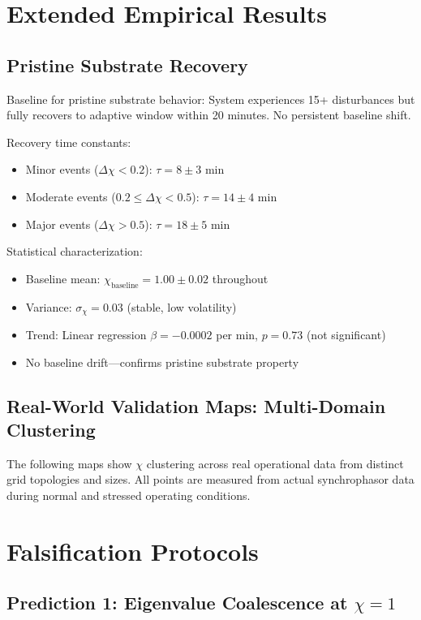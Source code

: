 \documentclass[11pt,letterpaper]{article}
\newcommand{\symchi}{\chi}
\begin{document}
\section{Extended Empirical Results}

\subsection{Pristine Substrate Recovery}

Baseline for pristine substrate behavior: System experiences 15+ disturbances but fully recovers to adaptive window within 20 minutes. No persistent baseline shift.

Recovery time constants:
\begin{itemize}
\item Minor events ($\Delta\symchi < 0.2$): $\tau = 8 \pm 3$ min
\item Moderate events ($0.2 \le \Delta\symchi < 0.5$): $\tau = 14 \pm 4$ min
\item Major events ($\Delta\symchi > 0.5$): $\tau = 18 \pm 5$ min
\end{itemize}

Statistical characterization:
\begin{itemize}
\item Baseline mean: $\symchi_{\text{baseline}} = 1.00 \pm 0.02$ throughout
\item Variance: $\sigma_\symchi = 0.03$ (stable, low volatility)
\item Trend: Linear regression $\beta = -0.0002$ per min, $p = 0.73$ (not significant)
\item No baseline drift—confirms pristine substrate property
\end{itemize}

\subsection{Real-World Validation Maps: Multi-Domain Clustering}

The following maps show $\chi$ clustering across real operational data from distinct grid topologies and sizes. All points are measured from actual synchrophasor data during normal and stressed operating conditions.

\section{Falsification Protocols}

\subsection{Prediction 1: Eigenvalue Coalescence at $\symchi = 1$}
\end{document}
